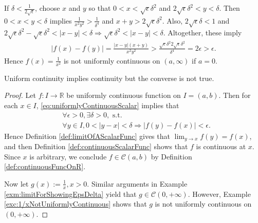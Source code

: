 \begin{solution}
If $\delta<\frac{1}{2\sqrt{\epsilon}}$,
 choose $x$ and $y$ so that $0<x<\sqrt{\epsilon}\delta^2$
 and $2\sqrt{\epsilon}\delta^2<y<\delta$.
Then $0<x<y<\delta$ implies $\frac{1}{x^2y^2}>\frac{1}{\delta^4}$
 and $x+y> 2\sqrt{\epsilon}\delta^2$.
Also, $2\sqrt{\epsilon}\delta<1$ and
 $2\sqrt{\epsilon}\delta^2-\sqrt{\epsilon}\delta^2<|x-y|<\delta \Rightarrow \sqrt{\epsilon}\delta^2<|x-y|<\delta$.
Altogether, these imply
\begin{align*}
|f(x)-f(y)| = \frac{|x-y|(x+y)}{x^2y^2}
> \frac{\sqrt{\epsilon}\delta^2 2\sqrt{\epsilon}\delta^2}{\delta^4}
=2\epsilon>\epsilon.
\end{align*}
Hence $f(x)=\frac{1}{x^2}$ is not uniformly continuous on $(a,\infty)$ if
$a=0$.
\end{solution}

\begin{thm}
  \label{thm:UniformCoutinuityImpliesContinuity}
  Uniform continuity implies continuity
   but the converse is not true.
\end{thm}
\begin{proof}
  Let $f:I\rightarrow \mathbb{R}$ be uniformly continuous function on $I=(a,b)$.
  Then for each $x\in I$, \eqref{eq:uniformlyContinuousScalar} implies that
  \begin{align*}
    &\forall \epsilon>0, \exists \delta>0, \text{ s.t. }\\
    &\forall y\in I, 0<|y-x|<\delta \Rightarrow |f(y)-f(x)|<\epsilon. 
  \end{align*}
  Hence Definition \ref{def:limitOfAScalarFunc} gives that
  $\lim_{y\rightarrow x}f(y)=f(x)$, and then Definition
  \ref{def:continuousScalarFunc} shows that
  $f$ is continuous at $x$. Since $x$ is arbitrary,
  we conclude $f\in \mathcal{C}(a,b)$
  by Definition \ref{def:continuousFuncOnR}.
  
  Now let $g(x):=\frac{1}{x},x>0$. Similar arguments in
  Example \ref{exm:limitForShowingEpsDelta} yield that
  $g\in \mathcal{C}(0,+\infty)$. However, Example
  \ref{exc:1/xNotUniformlyContinuous} shows that
  $g$ is not uniformly continuous on $(0,+\infty)$.
\end{proof}

